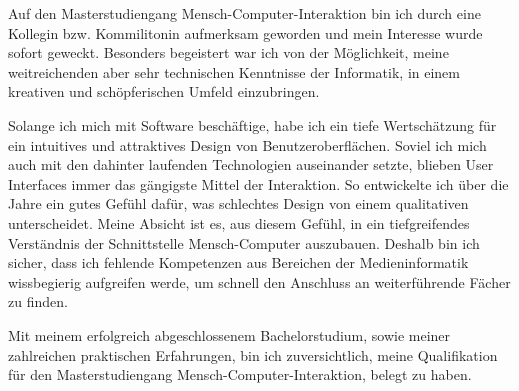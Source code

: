 \documentclass[11pt, a4paper]{awesome-cv}
\begin{document}
\begin{cvletter}

  Auf den Masterstudiengang Mensch-Computer-Interaktion bin ich durch eine Kollegin bzw. Kommilitonin aufmerksam geworden und mein Interesse wurde sofort geweckt. Besonders begeistert war ich von der Möglichkeit, meine weitreichenden aber sehr technischen Kenntnisse der Informatik, in einem kreativen und schöpferischen Umfeld einzubringen.

  Solange ich mich mit Software beschäftige, habe ich ein tiefe Wertschätzung für ein intuitives und attraktives Design von Benutzeroberflächen. Soviel ich mich auch mit den dahinter laufenden Technologien auseinander setzte, blieben User Interfaces immer das gängigste Mittel der Interaktion. So entwickelte ich über die Jahre ein gutes Gefühl dafür, was schlechtes Design von einem qualitativen unterscheidet. Meine Absicht ist es, aus diesem Gefühl, in ein tiefgreifendes Verständnis der Schnittstelle Mensch-Computer auszubauen. Deshalb bin ich sicher, dass ich fehlende Kompetenzen aus Bereichen der Medieninformatik wissbegierig aufgreifen werde, um schnell den Anschluss an weiterführende Fächer zu finden.

  Mit meinem erfolgreich abgeschlossenem Bachelorstudium, sowie meiner zahlreichen praktischen Erfahrungen, bin ich zuversichtlich, meine Qualifikation für den Masterstudiengang Mensch-Computer-Interaktion, belegt zu haben.

  \makeletterclosing

\end{cvletter}



\newpage
\end{document}
